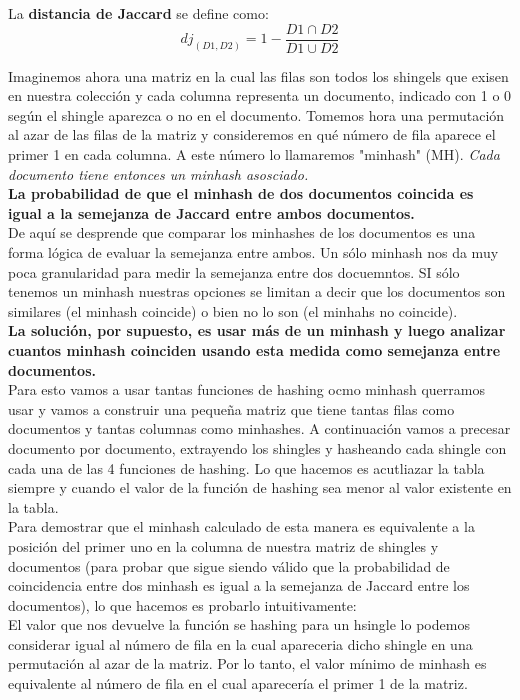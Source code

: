 \documentclass[titlepage,a4paper]{article}
\begin{document}
La \textbf{distancia de Jaccard} se define como: $$dj_(D1,D2) = 1-\frac{D1 \cap D2}{D1\cup D2}$$

Imaginemos ahora una matriz en la cual las filas son todos los shingels que exisen en nuestra colección y cada columna representa un documento, indicado con 1 o 0 según el shingle aparezca o no en el documento. Tomemos hora una permutación al azar de las filas de la matriz y consideremos en qué número de fila aparece el primer 1 en cada columna. A este número lo llamaremos "minhash" (MH). \textit{Cada documento tiene entonces un minhash asosciado. }\\

\textbf{La probabilidad de que el minhash de dos documentos coincida es igual a la semejanza de Jaccard entre ambos documentos. }\\

De aquí se desprende que comparar los minhashes de los documentos es una forma lógica de evaluar la semejanza entre ambos.  Un sólo minhash nos da muy poca granularidad para medir la semejanza entre dos docuemntos. SI sólo tenemos un minhash nuestras opciones se limitan a decir que los documentos son similares (el minhash coincide) o bien no lo son (el minhahs no coincide). \\

\textbf{La solución, por supuesto, es usar más de un minhash y luego analizar cuantos minhash coinciden usando esta medida como semejanza entre documentos. }\\

Para esto vamos a usar tantas funciones de hashing ocmo minhash querramos usar y vamos a construir una pequeña matriz que tiene tantas filas como documentos y tantas columnas como minhashes.  A continuación vamos a precesar documento por documento, extrayendo los shingles y hasheando cada shingle con cada una de las 4 funciones de hashing. Lo que hacemos es acutliazar la tabla siempre y cuando el valor de la función de hashing sea menor al valor existente en la tabla.\\

Para demostrar que el minhash calculado de esta manera es equivalente a la posición del primer uno en la columna de nuestra matriz de shingles y documentos (para probar que sigue siendo válido que la probabilidad de coincidencia entre dos minhash es igual a la semejanza de Jaccard entre los documentos), lo que hacemos es probarlo intuitivamente:  \\

El valor que nos devuelve la función se hashing para un hsingle lo podemos considerar igual al número de fila en la cual apareceria dicho shingle en una permutación al azar de la matriz. Por lo tanto, el valor mínimo de minhash es equivalente al número de fila en el cual aparecería el primer 1 de la matriz. \\
\end{document}
